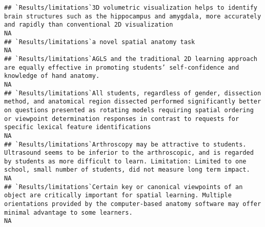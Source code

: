\documentclass[]{article}
\begin{document}
\begin{verbatim}
## `Results/limitations`3D volumetric visualization helps to identify brain structures such as the hippocampus and amygdala, more accurately and rapidly than conventional 2D visualization                                                                                                                                                                                                                                                                                              NA
## `Results/limitations`a novel spatial anatomy task                                                                                                                                                                                                                                                                                                                                                                                                                                     NA
## `Results/limitations`AGLS and the traditional 2D learning approach are equally effective in promoting students’ self-confidence and knowledge of hand anatomy.                                                                                                                                                                                                                                                                                                                        NA
## `Results/limitations`All students, regardless of gender, dissection method, and anatomical region dissected performed significantly better on questions presented as rotating models requiring spatial ordering or viewpoint determination responses in contrast to requests for specific lexical feature identifications                                                                                                                                                             NA
## `Results/limitations`Arthroscopy may be attractive to students. Ultrasound seems to be inferior to the arthroscopic, and is regarded by students as more difficult to learn. Limitation: Limited to one school, small number of students, did not measure long term impact.                                                                                                                                                                                                           NA
## `Results/limitations`Certain key or canonical viewpoints of an object are critically important for spatial learning. Multiple orientations provided by the computer-based anatomy software may offer minimal advantage to some learners.                                                                                                                                                                                                                                              NA

\end{verbatim}
\end{document}
